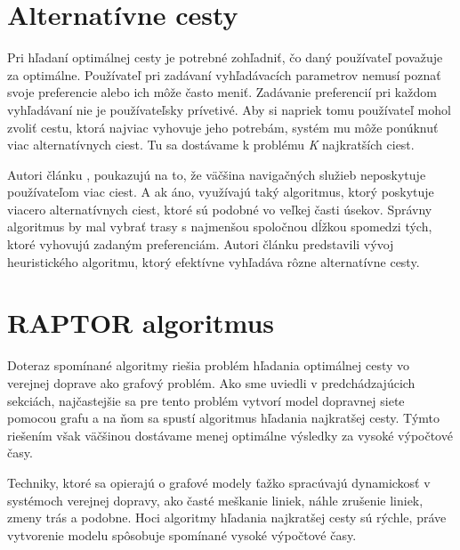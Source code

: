 \section{Alternatívne cesty}
\label{sec:alternative-optimal-paths}
Pri hľadaní optimálnej cesty je potrebné zohľadniť, čo daný používateľ považuje za optimálne. Používateľ pri zadávaní vyhľadávacích parametrov nemusí poznať svoje preferencie alebo ich môže často meniť. Zadávanie preferencií pri každom vyhľadávaní nie je používateľsky prívetivé. Aby si napriek tomu používateľ mohol zvoliť cestu, ktorá najviac vyhovuje jeho potrebám, systém mu môže ponúknuť viac alternatívnych ciest. Tu sa dostávame k problému \textit{K} najkratších ciest.

Autori článku \cite{dissimilar}, poukazujú na to, že väčšina navigačných služieb neposkytuje používateľom viac ciest. A ak áno, využívajú taký algoritmus, ktorý poskytuje viacero alternatívnych ciest, ktoré sú podobné vo veľkej časti úsekov. Správny algoritmus by mal vybrať trasy s najmenšou spoločnou dĺžkou spomedzi tých, ktoré vyhovujú zadaným preferenciám. Autori článku predstavili vývoj heuristického algoritmu, ktorý efektívne vyhľadáva rôzne alternatívne cesty. %


\section{RAPTOR algoritmus}
\label{sec:raptor}
Doteraz spomínané algoritmy riešia problém hľadania optimálnej cesty vo verejnej doprave ako grafový problém. Ako sme uviedli v predchádzajúcich sekciách, najčastejšie sa pre tento problém vytvorí model dopravnej siete pomocou grafu a na ňom sa spustí algoritmus hľadania najkratšej cesty. Týmto riešením však väčšinou dostávame menej optimálne výsledky za vysoké výpočtové časy.

Techniky, ktoré sa opierajú o grafové modely ťažko spracúvajú dynamickosť v systémoch verejnej dopravy, ako časté meškanie liniek, náhle zrušenie liniek, zmeny trás a podobne. Hoci algoritmy hľadania najkratšej cesty sú rýchle, práve vytvorenie modelu spôsobuje spomínané vysoké výpočtové časy.

